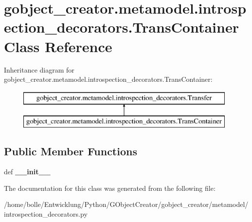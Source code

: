 \hypertarget{classgobject__creator_1_1metamodel_1_1introspection__decorators_1_1TransContainer}{
\section{gobject\_\-creator.metamodel.introspection\_\-decorators.TransContainer Class Reference}
\label{classgobject__creator_1_1metamodel_1_1introspection__decorators_1_1TransContainer}
}
Inheritance diagram for gobject\_\-creator.metamodel.introspection\_\-decorators.TransContainer:\begin{figure}[H]
\begin{center}
\leavevmode
\includegraphics[height=2cm]{classgobject__creator_1_1metamodel_1_1introspection__decorators_1_1TransContainer}
\end{center}
\end{figure}
\subsection*{Public Member Functions}
\begin{DoxyCompactItemize}
\item 
\hypertarget{classgobject__creator_1_1metamodel_1_1introspection__decorators_1_1TransContainer_a817bbae0db5ded10f60296d7c2898ac4}{
def {\bfseries \_\-\_\-init\_\-\_\-}}
\label{classgobject__creator_1_1metamodel_1_1introspection__decorators_1_1TransContainer_a817bbae0db5ded10f60296d7c2898ac4}

\end{DoxyCompactItemize}


The documentation for this class was generated from the following file:\begin{DoxyCompactItemize}
\item 
/home/bolle/Entwicklung/Python/GObjectCreator/gobject\_\-creator/metamodel/introspection\_\-decorators.py\end{DoxyCompactItemize}
